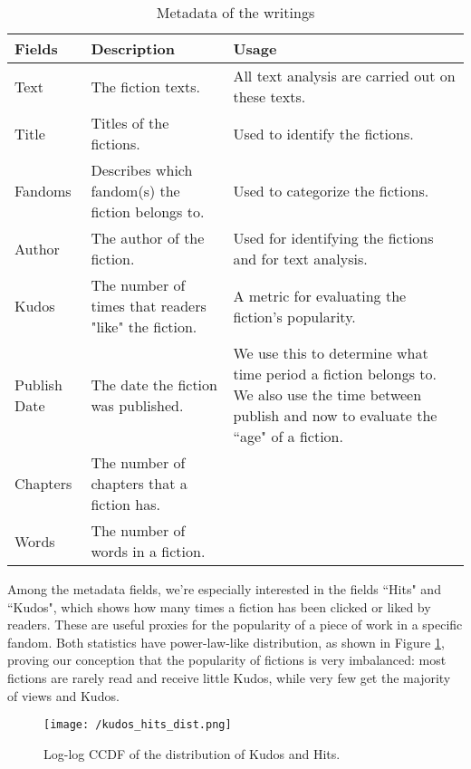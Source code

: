 \documentclass[11pt]{article} %
\begin{document}
\begin{table}[htp]
\caption{Metadata of the writings}
\begin{center}
\begin{tabular}[width=0.8\textwidth]{p{2cm}|p{4cm}|p{5cm}}
  \hline			
 Fields & Description & Usage\\ 
   \hline			
Text & The fiction texts. & All text analysis are carried out on these texts.\\\hline
Title & Titles of the fictions. & Used to identify the fictions. \\\hline
Fandoms & Describes which fandom(s) the fiction belongs to. & Used to categorize the fictions.\\\hline
Author & The author of the fiction. & Used for identifying the fictions and for text analysis. \\\hline
Kudos & The number of times that readers "like" the fiction. &  A metric for evaluating the fiction's popularity.\\\hline
Publish Date & The date the fiction was published. & We use this to determine what time period a fiction belongs to. We also use the time between publish and now to evaluate the ``age" of a fiction.\\\hline
Chapters & The number of chapters that a fiction has. \\\hline
Words & The number of words in a fiction.\\\hline

\hline
\end{tabular}
\end{center}
\label{tab:metadata}
\end{table}%

Among the metadata fields, we're especially interested in the fields ``Hits" and ``Kudos", which shows how many times a fiction has been clicked or liked by readers. These are useful proxies for the popularity of a piece of work in a specific fandom.
Both statistics have power-law-like distribution, as shown in  Figure \ref{fig:long_tail}, proving our conception that the popularity of fictions is very imbalanced: most fictions are rarely read and receive little Kudos, while very few get the majority of views and Kudos.

\begin{figure}[htbp]
\begin{center}
\texttt{[image: /kudos\_hits\_dist.png]}
\caption{Log-log CCDF of the distribution of Kudos and Hits.}
\label{fig:long_tail}
\end{center}
\end{figure}
\end{document}
